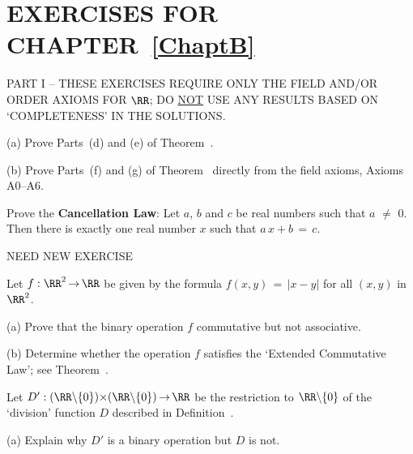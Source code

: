                        \section{EXERCISES FOR CHAPTER~\ref{ChaptB}}
                        \label{SectBEX}

\V
\V
\V
\V

\begin{center}
PART I -- THESE EXERCISES REQUIRE ONLY THE FIELD AND/OR ORDER AXIOMS FOR ${\RR}$; DO \underline{NOT} USE ANY RESULTS BASED ON `COMPLETENESS' IN THE SOLUTIONS.
\end{center}

\V
\V
\V
\V

 \noindent \ExBa \label{ExBa} (a) Prove Parts~(d) and (e) of Theorem~.

\V

        (b) Prove Parts~(f) and (g) of Theorem~ directly from the field axioms, Axioms A0--A6. %

\V
\V

\noindent \ExBb \label{ExBb} Prove the {\bf Cancellation Law}: Let $a$, $b$ and $c$ be real numbers such that $a \,\,{\neq}\,\, 0$.
    Then there is exactly one real number $x$ such that $a\,x+b \,=\, c$.

\V
\V

\noindent \ExBc NEED NEW EXERCISE %

\V
\V

\noindent \ExBd Let $f:{\RR}^{2} \,{\rightarrow}\, {\RR}$ be given by the formula $f(x,y) \,=\, |x-y|$ for all $(x,y)$ in ${\RR}^{2}$.

\V

        (a) Prove that the binary operation $f$ commutative but not associative.

\V

        (b) Determine whether the operation $f$ satisfies the `Extended Commutative Law'; see Theorem~.

\V
\V

\noindent \ExBe Let $D':({\RR}{\setminus}\{0\}){\times}({\RR}{\setminus}\{0\}) \,{\rightarrow}\, {\RR}$ be the restriction to ${\RR}{\setminus}\{0\}$ of the `division' function $D$ described in Definition~. %

\V

        (a) Explain why $D'$ is a binary operation but $D$ is not.


